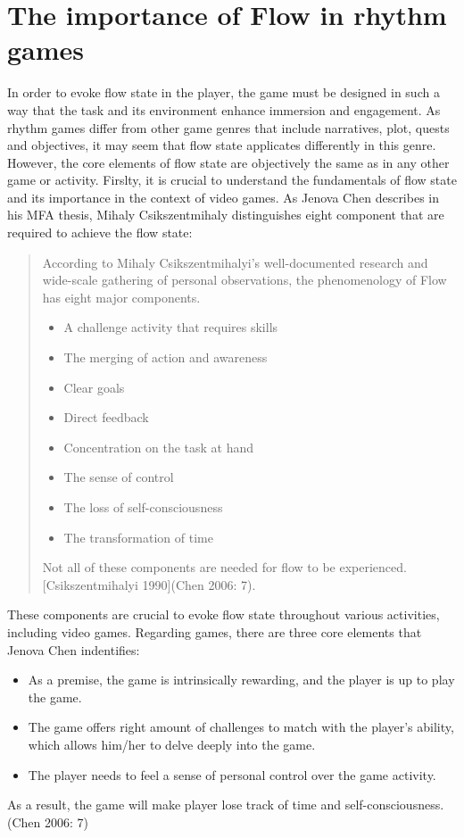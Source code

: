 \section{The importance of Flow in rhythm games}
In order to evoke flow state in the player, the game must be designed in such a way that the task and its environment enhance immersion and engagement. As rhythm games differ from other game genres that include narratives, plot, quests and objectives, it may seem that flow state applicates differently in this genre. However, the core elements of flow state are objectively the same as in any other game or activity.
Firslty, it is crucial to understand the fundamentals of flow state and its importance in the context of video games. As Jenova Chen describes in his MFA thesis, Mihaly Csikszentmihaly distinguishes eight component that are required to achieve the flow state:
\begin{quote}
According to Mihaly Csikszentmihalyi’s well-documented research and wide-scale
gathering of personal observations, the phenomenology of Flow has eight major
components.
\begin {itemize}
\item A challenge activity that requires skills
\item The merging of action and awareness
\item Clear goals
\item Direct feedback
\item Concentration on the task at hand
\item The sense of control
\item The loss of self-consciousness
\item The transformation of time
\end {itemize}
Not all of these components are needed for flow to be experienced. [Csikszentmihalyi 1990](Chen 2006: 7).
\end{quote}

These components are crucial to evoke flow state throughout various activities, including video games. Regarding games, there are three core elements that Jenova Chen indentifies: 
\begin {itemize}
\item As a premise, the game is intrinsically rewarding, and the player is up to play the game.
\item The game offers right amount of challenges to match with the player’s ability, which allows him/her to delve deeply into the game.
\item The player needs to feel a sense of personal control over the game activity. 
\end {itemize}
As a result, the game will make player lose track of time and self-consciousness. (Chen 2006: 7)

